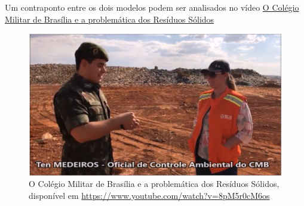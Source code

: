 Um contraponto entre os dois modelos podem ser analisados no vídeo \href{https://www.youtube.com/watch?v=8pM5r0cM6os}{O Colégio Militar de Brasília e a problemática dos Resíduos Sólidos} \nocite{CMB20180616}

\begin{figure}[h!]
    \centering
    \includegraphics[width=0.7\linewidth]{fig/Colegio-Militar-no-Aterro}
    \caption{O Colégio Militar de Brasília e a problemática dos Resíduos Sólidos, disponível em \url{https://www.youtube.com/watch?v=8pM5r0cM6os}}
    \label{fig:colegio-militar-no-aterro}
\end{figure}

